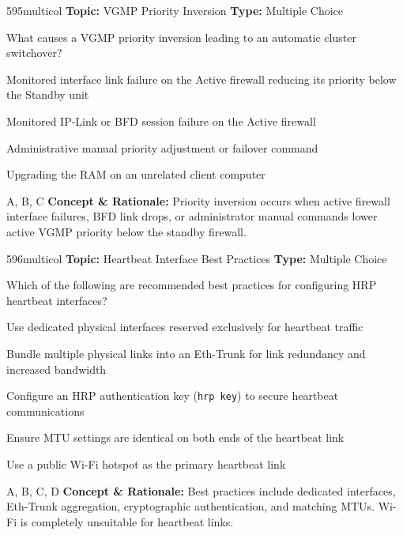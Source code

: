 \begin{qcard}{595}{multicol}
\textcolor{darkslate!75}{\small\textbf{Topic:} VGMP Priority Inversion \hfill \textbf{Type:} Multiple Choice}\vspace{0.4em}\par
What causes a VGMP priority inversion leading to an automatic cluster switchover?
\begin{qoptions}
\item Monitored interface link failure on the Active firewall reducing its priority below the Standby unit
\item Monitored IP-Link or BFD session failure on the Active firewall
\item Administrative manual priority adjustment or failover command
\item Upgrading the RAM on an unrelated client computer
\end{qoptions}
\end{qcard}
\nopagebreak
\begin{explainbox}{A, B, C}
\textbf{Concept \& Rationale:} Priority inversion occurs when active firewall interface failures, BFD link drops, or administrator manual commands lower active VGMP priority below the standby firewall.
\end{explainbox}

\begin{qcard}{596}{multicol}
\textcolor{darkslate!75}{\small\textbf{Topic:} Heartbeat Interface Best Practices \hfill \textbf{Type:} Multiple Choice}\vspace{0.4em}\par
Which of the following are recommended best practices for configuring HRP heartbeat interfaces?
\begin{qoptions}
\item Use dedicated physical interfaces reserved exclusively for heartbeat traffic
\item Bundle multiple physical links into an Eth-Trunk for link redundancy and increased bandwidth
\item Configure an HRP authentication key (\texttt{hrp key}) to secure heartbeat communications
\item Ensure MTU settings are identical on both ends of the heartbeat link
\item Use a public Wi-Fi hotspot as the primary heartbeat link
\end{qoptions}
\end{qcard}
\nopagebreak
\begin{explainbox}{A, B, C, D}
\textbf{Concept \& Rationale:} Best practices include dedicated interfaces, Eth-Trunk aggregation, cryptographic authentication, and matching MTUs. Wi-Fi is completely unsuitable for heartbeat links.
\end{explainbox}

